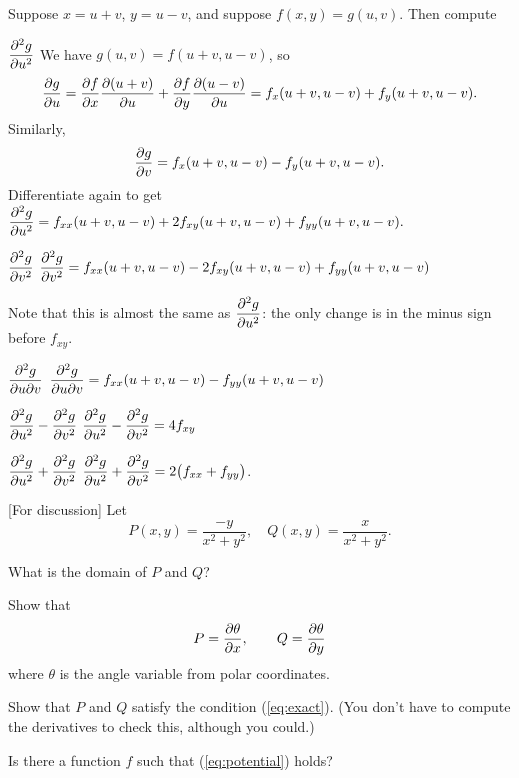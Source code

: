 \begin{multicols}{2}
\problem Suppose $x=u+v$, $y=u-v$, and suppose $f(x, y) = g(u, v)$.  
Then compute

\subprob $\dfrac{\partial^2 g}{\partial u^2}$%
\answer
We have $g(u,v) = f(u+v, u-v)$, so
\[
  \frac{\partial g}{\partial u} = \frac{\partial f}{\partial x} \frac{\partial (u+v)}{\partial u} + \frac{\partial f}{\partial y} \frac{\partial (u-v)}{\partial u}
  = f_x(u+v, u-v)+f_y(u+v, u-v).
\]
Similarly,
\[
  \frac{\partial g}{\partial v} = f_x(u+v, u-v) - f_y(u+v, u-v).
\]
Differentiate again to get
\(\displaystyle
  \frac{\partial^2 g}{\partial u^2}
  = f_{xx}(u+v, u-v)+2f_{xy}(u+v, u-v)+f_{yy}(u+v, u-v).
\)
\endanswer

\subprob $\dfrac{\partial^2 g}{\partial v^2}$
\answer
\(\displaystyle 
\frac{\partial^2 g}{\partial v^2}
= f_{xx}(u+v, u-v)-2f_{xy}(u+v, u-v)+f_{yy}(u+v, u-v)
\)

Note that this is almost the same as $\dfrac{\partial^2g}{\partial u^2}$: the only change is in the minus sign before $f_{xy}$.
\endanswer

\subprob   $\dfrac{\partial^2 g}{\partial u\partial v}$
\answer
   $\displaystyle\frac{\partial^2 g}{\partial u\partial v}= f_{xx}(u+v, u-v) - f_{yy}(u+v, u-v)$
\endanswer

\subprob $\dfrac{\partial^2 g}{\partial u^2} - \dfrac{\partial^2 g}{\partial v^2}$
\answer
$\dfrac{\partial^2 g}{\partial u^2} - \dfrac{\partial^2 g}{\partial v^2} = 4f_{xy} $
\endanswer

\subprob $\dfrac{\partial^2 g}{\partial u^2} + \dfrac{\partial^2 g}{\partial v^2}$
\answer
$\dfrac{\partial^2 g}{\partial u^2} + \dfrac{\partial^2 g}{\partial v^2} = 2\bigl(f_{xx}+f_{yy}\bigr)$.
\endanswer

\problem\label{prb:grad-of-theta} 
[For discussion] Let 
\[
  P(x,y) = \frac{-y}{x^2+y^2},
  \quad
  Q(x,y) = \frac{x}{x^2+y^2}.
\]

\subprob What is the domain of $P$ and $Q$?

\subprob Show that
\[
  P = \frac{\partial \theta}{\partial x}, \qquad
  Q = \frac{\partial \theta}{\partial y}
\]
where $\theta$ is the angle variable from polar coordinates.

\subprob Show that $P$ and $Q$ satisfy the condition
(\ref{eq:exact}).  (You don't have to compute the derivatives to
check this, although you could.)

\subprob Is there a function $f$ such that (\ref{eq:potential}) holds?

\noproblemfont
\end{multicols}

